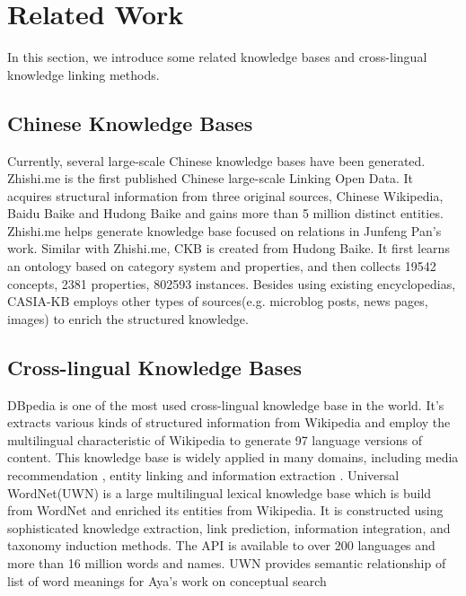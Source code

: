\documentclass[runningheads,a4paper]{llncs}
\begin{document}

\section{Related Work}
\label{sec:work}
In this section, we introduce some related knowledge bases and cross-lingual knowledge linking methods.
\subsection{Chinese Knowledge Bases}
Currently, several large-scale Chinese knowledge bases have been generated. Zhishi.me\cite{niu2011zhishi,wang2014publishing} is the first published Chinese large-scale Linking Open Data. It acquires structural information from three original sources, Chinese Wikipedia, Baidu Baike and Hudong Baike and gains more than 5 million distinct entities. Zhishi.me helps generate knowledge base focused on relations in Junfeng Pan’s work\cite{pan2012building}.
Similar with Zhishi.me, CKB\cite{wang2012building} is created from Hudong Baike. It first learns an ontology based on category system and properties, and then collects 19542 concepts, 2381 properties, 802593 instances. Besides using existing encyclopedias, CASIA-KB employs other types of sources(e.g. microblog posts, news pages, images) to enrich the structured knowledge.
\subsection{Cross-lingual Knowledge Bases}
DBpedia \cite{auer2007dbpedia,mendes2012dbpedia} is one of the most used cross-lingual knowledge base in the world. It's extracts various kinds of structured information from Wikipedia and employ the multilingual characteristic of Wikipedia to generate 97 language versions of content. This knowledge base is widely applied in many domains, including media recommendation \cite{passant2010dbrec,fernandez2011generic,kaminskas2012knowledge}, entity linking\cite{mendes2011evaluating} and information extraction \cite{dutta2013integrating}.
Universal WordNet(UWN)\cite{de2012uwn} is a large multilingual lexical knowledge base which is build from WordNet and enriched its entities from Wikipedia. It is constructed using sophisticated knowledge extraction, link prediction, information integration, and taxonomy induction methods. The API is available to over 200 languages and more than 16 million words and names. UWN provides semantic relationship of list of word meanings for Aya's work on conceptual search \cite{al2015conceptual}
\end{document}
